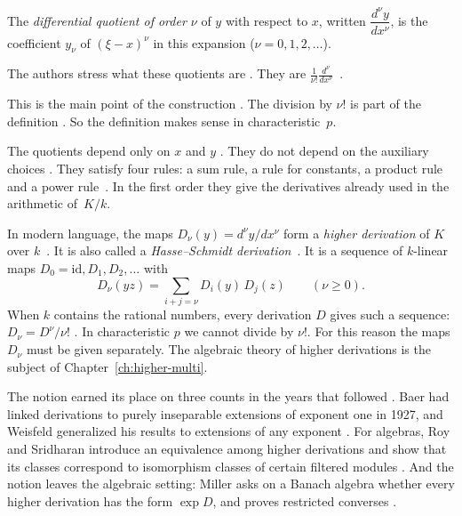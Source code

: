 \begin{definition}\label{def:origins:hasse-schmidt}
The \emph{differential quotient of order $\nu$} of $y$ with respect to $x$,
written $\dfrac{d^\nu y}{dx^\nu}$, is the coefficient $y_\nu$ of
$(\xi - x)^\nu$ in this expansion ($\nu = 0, 1, 2, \ldots$).
\end{definition}

The authors stress what these quotients are \cite[p.~217]{HasseSchmidt1937}.
They are 
$\frac{1}{\nu!}\frac{d^\nu}{dx^\nu}$~\cite[p.~217]{HasseSchmidt1937}.

This is the main point of the construction \cite[p.~217]{HasseSchmidt1937}.
The division by $\nu!$ is part of the definition \cite[\S 2,
p.~217]{HasseSchmidt1937}. So the definition makes sense in
characteristic~$p$.

The quotients depend only on $x$ and $y$ \cite[p.~218,
(1)--(4)]{HasseSchmidt1937}. They do not depend on the auxiliary choices
\cite[p.~218, (1)--(4)]{HasseSchmidt1937}. They satisfy four rules: a sum
rule, a rule for constants, a product rule and a power rule~\cite[p.~218,
(1)--(4)]{HasseSchmidt1937}. In the first order they give the derivatives
already used in the arithmetic of~$K/k$.

In modern language, the maps $D_\nu(y) = d^\nu y/dx^\nu$ form a \emph{higher derivation} of $K$
over $k$~\cite[p.~218]{HasseSchmidt1937}. It is also called a \emph{Hasse--Schmidt derivation}~\cite[p.~218]{HasseSchmidt1937}. It is a
sequence of $k$-linear maps $D_0 = \mathrm{id}, D_1, D_2, \ldots$ with
\[
D_\nu(yz) = \sum_{i+j=\nu} D_i(y)\, D_j(z) \qquad (\nu \ge 0).
\]
When $k$ contains the rational numbers, every derivation $D$ gives such a
sequence: $D_\nu = D^\nu/\nu!$ \cite[p.~218]{HasseSchmidt1937}. In
characteristic $p$ we cannot divide by $\nu!$. For this reason the maps
$D_\nu$ must be given separately. The
algebraic theory of higher derivations is the subject of
Chapter~\ref{ch:higher-multi}.

The notion earned its place on three counts in the years that followed
\cite[p.~31]{Heerema1968Convergent}. Baer had linked derivations to purely
inseparable extensions of exponent one in 1927, and Weisfeld generalized his
results to extensions of any exponent \cite[pp.~307--318]{Weisfeld1965Purely}.
For algebras, Roy and Sridharan introduce an equivalence among higher
derivations and show that its classes correspond to isomorphism classes of
certain filtered modules \cite[Introduction,
pp.~115--116]{RoySridharan1968Higher}. And the notion leaves the algebraic
setting: Miller asks on a Banach algebra whether every higher derivation has
the form $\exp D$, and proves restricted converses
\cite[pp.~301--331]{Miller1970Higher}.

